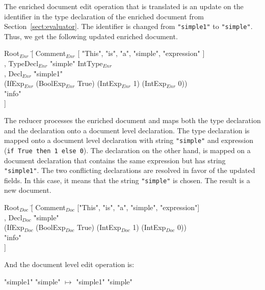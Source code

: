 The enriched document edit operation that is translated is an update on the identifier in the type declaration of the enriched document from Section~\ref{sect:evaluator}. The identifier is changed from \verb|"simple1"| to \verb|"simple"|. Thus, we get the following updated enriched document.

\small \ttfamily
\begin{tabbing}
Root$_{Enr}$ \= [ Comment$_{Enr}$ [ "This", "is", "a", "simple", "expression" ]\\
       \> , TypeDecl$_{Enr}$ "simple" IntType$_{Enr}$\\
       \> , Decl$_{Enr}$ \= "simple1"\\
       \>                       \> (IfExp$_{Enr}$ (BoolExp$_{Enr}$ True) (IntExp$_{Enr}$ 1) (IntExp$_{Enr}$ 0)) \\
       \>                       \> "info"\\
       \> ] 
\end{tabbing}
\rmfamily \normalsize

The reducer processes the enriched document and maps both the type declaration and the declaration onto a document level declaration. The type declaration is mapped onto a document level declaration with string \verb|"simple"| and expression (\verb|if True then 1 else 0|). The declaration on the other hand, is mapped on a document declaration that contains the same expression but has string \verb|"simple1"|. The two conflicting declarations are resolved in favor of the updated fields. In this case, it means that the string \verb|"simple"| is chosen. The result is a new document.

\small \ttfamily
\begin{tabbing}
Root$_{Doc}$ \= [ Comment$_{Doc}$ ["This", "is", "a", "simple", "expression"] \\
       \> , Decl$_{Doc}$ \= "simple" \\
       \>                        \>(IfExp$_{Doc}$ (BoolExp$_{Doc}$ True) (IntExp$_{Doc}$ 1) (IntExp$_{Doc}$ 0))\\
       \>                       \> "info"\\
       \> ] 
\end{tabbing}
\rmfamily \normalsize

And the document level edit operation is:

\small \ttfamily
\begin{tabbing}
 \ttfamily "simple1"  \ttfamily  "simple" $\mapsto$  \ttfamily  "simple1"  \ttfamily  "simple"
\end{tabbing}
\rmfamily \normalsize

